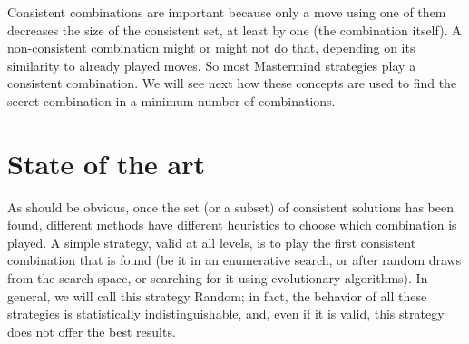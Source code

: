 \documentclass[preprint,12pt]{elsarticle}
\begin{document}
Consistent combinations are important because only a move using one of
them decreases the size of the consistent set, at least by one (the
combination itself). A non-consistent combination might or might not
do that, depending on its similarity to already played moves. So most
Mastermind strategies play a consistent combination. We will see next
how these concepts are used to find the secret combination in a
minimum number of combinations. 

\section{State of the art}
\label{s:soa}

As should be obvious, once the set (or a subset) of consistent
solutions has been found, different methods  have different heuristics
to choose which combination is played. A simple
strategy, valid at all levels, is to play the first consistent
combination that is found (be it in an enumerative search, or after
random draws from the search space, or searching for it using
evolutionary algorithms\cite{mastermind05}). In general, we will call
this strategy Random; in fact, the behavior of all these strategies is
statistically indistinguishable, and, even if it is valid, this strategy does not
offer the best results.
\end{document}
